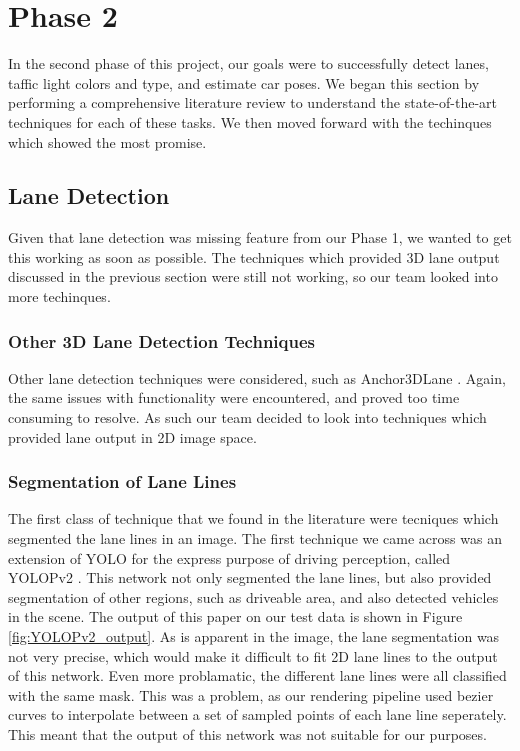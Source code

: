 \section{Phase 2}

In the second phase of this project, our goals were to successfully detect lanes, taffic light colors and type, and estimate car poses. We began this section by performing a comprehensive literature review to understand the state-of-the-art techniques for each of these tasks. We then moved forward with the techinques which showed the most promise.


\subsection{Lane Detection}
Given that lane detection was missing feature from our Phase 1, we wanted to get this working as soon as possible. The techniques which provided 3D lane output discussed in the previous section were still not working, so our team looked into more techinques. 

\subsubsection{Other 3D Lane Detection Techniques}
Other lane detection techniques were considered, such as Anchor3DLane \cite{Anchor3DLane}. Again, the same issues with functionality were encountered, and proved too time consuming to resolve. As such our team decided to look into techniques which provided lane output in 2D image space.

\subsubsection{Segmentation of Lane Lines}
The first class of technique that we found in the literature were tecniques which segmented the lane lines in an image. The first technique we came across was an extension of YOLO for the express purpose of driving perception, called YOLOPv2 \cite{YOLOPv2}. This network not only segmented the lane lines, but also provided segmentation of other regions, such as driveable area, and also detected vehicles in the scene. The output of this paper on our test data is shown in Figure \ref{fig:YOLOPv2_output}. As is apparent in the image, the lane segmentation was not very precise, which would make it difficult to fit 2D lane lines to the output of this network. Even more problamatic, the different lane lines were all classified with the same mask. This was a problem, as our rendering pipeline used bezier curves to interpolate between a set of sampled points of each lane line seperately. This meant that the output of this network was not suitable for our purposes.

